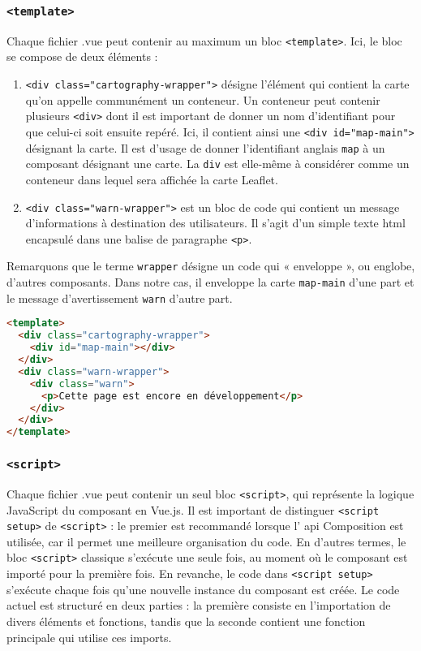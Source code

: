 \subsubsection{\texttt{<template>}}
Chaque fichier .vue peut contenir au maximum un bloc \texttt{<template>}. Ici, le bloc se compose de deux éléments : 
\begin{enumerate}
    \item \texttt{<div class="cartography-wrapper">} désigne l'élément qui contient la carte qu'on appelle communément un conteneur. Un conteneur peut contenir plusieurs \texttt{<div>} dont il est important de donner un nom d'identifiant pour que celui-ci soit ensuite repéré. Ici, il contient ainsi une \texttt{<div id="map-main">} désignant la carte. Il est d'usage de donner l'identifiant anglais \texttt{map} à un composant désignant une carte. La \texttt{div} est elle-même à considérer comme un conteneur dans lequel sera affichée la carte Leaflet. 
    \item \texttt{<div class="warn-wrapper">} est un bloc de code qui contient un message d'informations à destination des utilisateurs. Il s'agit d'un simple texte  \acrshort{html} encapsulé dans une balise de paragraphe \texttt{<p>}. 
\end{enumerate}
Remarquons que le terme \texttt{wrapper} désigne un code qui « enveloppe », ou englobe, d'autres composants. Dans notre cas, il enveloppe la carte \texttt{map-main} d'une part et le message d'avertissement \texttt{warn} d'autre part.

\begin{lstlisting}[language=HTML, caption=Code HTML du fond de carte pour la balise <template> en Vue.js]
<template>
  <div class="cartography-wrapper">
    <div id="map-main"></div>
  </div>
  <div class="warn-wrapper">
    <div class="warn">
      <p>Cette page est encore en développement</p>
    </div>
  </div>
</template>
\end{lstlisting}

\subsubsection{\texttt{<script>}}
Chaque fichier .vue peut contenir un seul bloc \texttt{<script>}, qui représente la logique JavaScript du composant en Vue.js. Il est important de distinguer \texttt{<script setup>} de \texttt{<script>} : le premier est recommandé lorsque l' \acrshort{api} Composition est utilisée, car il permet une meilleure organisation du code. En d'autres termes, le bloc \texttt{<script>} classique s'exécute une seule fois, au moment où le composant est importé pour la première fois. En revanche, le code dans \texttt{<script setup>} s'exécute chaque fois qu'une nouvelle instance du composant est créée. Le code actuel est structuré en deux parties : la première consiste en l'importation de divers éléments et fonctions, tandis que la seconde contient une fonction principale qui utilise ces imports.

